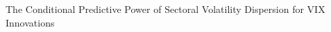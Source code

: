 \documentclass[]{article}
\begin{document}
The Conditional Predictive Power of Sectoral Volatility Dispersion for VIX Innovations
\end{document}
